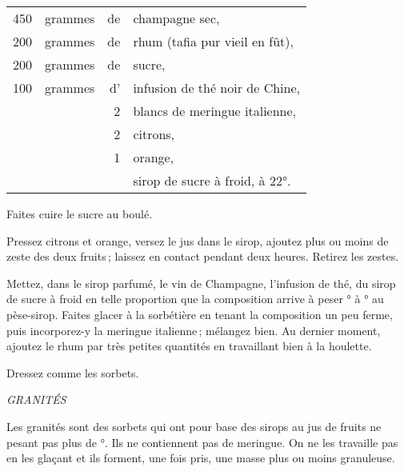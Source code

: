 \footnotesize
\begin{longtable}{rrrp{16em}}
    450 & grammes & de & champagne sec,                                                                   \\
    200 & grammes & de & rhum (tafia pur vieil en fût),                                                   \\
    200 & grammes & de & sucre,                                                                           \\
    100 & grammes & d' & infusion de thé noir de Chine,                                                   \\
        &         &  2 & blancs de meringue italienne,                                                    \\
        &         &  2 & citrons,                                                                         \\
        &         &  1 & orange,                                                                          \\
        &         &    & sirop de sucre à froid, à 22°.                                                   \\
\end{longtable}
\normalsize

Faites cuire le sucre au boulé.

Pressez citrons et orange, versez le jus dans le sirop, ajoutez plus ou moins de
zeste des deux fruits ; laissez en contact pendant deux heures. Retirez les zestes.

Mettez, dans le sirop parfumé, le vin de Champagne, l'infusion de thé, du sirop
de sucre à froid en telle proportion que la composition arrive à peser
{\mmm}° à {\mmm}° au pèse-sirop. Faites glacer à la sorbétière en
tenant la composition un peu ferme, puis incorporez-y la meringue italienne ;
mélangez bien. Au dernier moment, ajoutez le rhum par très petites quantités en
travaillant bien à la houlette.

Dressez comme les sorbets.

\bigskip

\begin{center}
\textit{GRANITÉS}
\end{center}

\bigskip

Les granités sont des sorbets qui ont pour base des sirops au jus de fruits ne
pesant pas plus de {\mmm}°. Ils ne contiennent pas de meringue. On ne les
travaille pas en les glaçant et ils forment, une fois pris, une masse plus ou
moins granuleuse.

